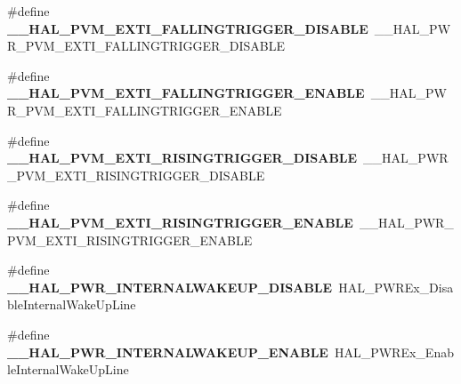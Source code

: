 \begin{DoxyCompactItemize}
\#define {\bfseries \+\_\+\+\_\+\+H\+A\+L\+\_\+\+P\+V\+M\+\_\+\+E\+X\+T\+I\+\_\+\+F\+A\+L\+L\+I\+N\+G\+T\+R\+I\+G\+G\+E\+R\+\_\+\+D\+I\+S\+A\+B\+LE}~\+\_\+\+\_\+\+H\+A\+L\+\_\+\+P\+W\+R\+\_\+\+P\+V\+M\+\_\+\+E\+X\+T\+I\+\_\+\+F\+A\+L\+L\+I\+N\+G\+T\+R\+I\+G\+G\+E\+R\+\_\+\+D\+I\+S\+A\+B\+LE
\item 
\mbox{\label{group___h_a_l___p_w_r___aliased___macros_gaccadba375e65b5f60069a416f7c55024}} 
\#define {\bfseries \+\_\+\+\_\+\+H\+A\+L\+\_\+\+P\+V\+M\+\_\+\+E\+X\+T\+I\+\_\+\+F\+A\+L\+L\+I\+N\+G\+T\+R\+I\+G\+G\+E\+R\+\_\+\+E\+N\+A\+B\+LE}~\+\_\+\+\_\+\+H\+A\+L\+\_\+\+P\+W\+R\+\_\+\+P\+V\+M\+\_\+\+E\+X\+T\+I\+\_\+\+F\+A\+L\+L\+I\+N\+G\+T\+R\+I\+G\+G\+E\+R\+\_\+\+E\+N\+A\+B\+LE
\item 
\mbox{\label{group___h_a_l___p_w_r___aliased___macros_gae9adfcfaa1b854813eb292c1a98eb115}} 
\#define {\bfseries \+\_\+\+\_\+\+H\+A\+L\+\_\+\+P\+V\+M\+\_\+\+E\+X\+T\+I\+\_\+\+R\+I\+S\+I\+N\+G\+T\+R\+I\+G\+G\+E\+R\+\_\+\+D\+I\+S\+A\+B\+LE}~\+\_\+\+\_\+\+H\+A\+L\+\_\+\+P\+W\+R\+\_\+\+P\+V\+M\+\_\+\+E\+X\+T\+I\+\_\+\+R\+I\+S\+I\+N\+G\+T\+R\+I\+G\+G\+E\+R\+\_\+\+D\+I\+S\+A\+B\+LE
\item 
\mbox{\label{group___h_a_l___p_w_r___aliased___macros_ga1c9b5b08f0208e76f261cc82b1d47215}} 
\#define {\bfseries \+\_\+\+\_\+\+H\+A\+L\+\_\+\+P\+V\+M\+\_\+\+E\+X\+T\+I\+\_\+\+R\+I\+S\+I\+N\+G\+T\+R\+I\+G\+G\+E\+R\+\_\+\+E\+N\+A\+B\+LE}~\+\_\+\+\_\+\+H\+A\+L\+\_\+\+P\+W\+R\+\_\+\+P\+V\+M\+\_\+\+E\+X\+T\+I\+\_\+\+R\+I\+S\+I\+N\+G\+T\+R\+I\+G\+G\+E\+R\+\_\+\+E\+N\+A\+B\+LE
\item 
\mbox{\label{group___h_a_l___p_w_r___aliased___macros_ga08dae9cbb242393b15d2fbaa793676b5}} 
\#define {\bfseries \+\_\+\+\_\+\+H\+A\+L\+\_\+\+P\+W\+R\+\_\+\+I\+N\+T\+E\+R\+N\+A\+L\+W\+A\+K\+E\+U\+P\+\_\+\+D\+I\+S\+A\+B\+LE}~H\+A\+L\+\_\+\+P\+W\+R\+Ex\+\_\+\+Disable\+Internal\+Wake\+Up\+Line
\item 
\mbox{\label{group___h_a_l___p_w_r___aliased___macros_ga94aa4eb5a81a531ebca4773d808295b7}} 
\#define {\bfseries \+\_\+\+\_\+\+H\+A\+L\+\_\+\+P\+W\+R\+\_\+\+I\+N\+T\+E\+R\+N\+A\+L\+W\+A\+K\+E\+U\+P\+\_\+\+E\+N\+A\+B\+LE}~H\+A\+L\+\_\+\+P\+W\+R\+Ex\+\_\+\+Enable\+Internal\+Wake\+Up\+Line

\end{DoxyCompactItemize}

